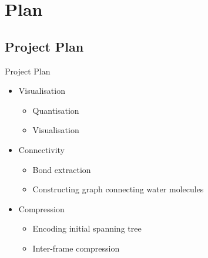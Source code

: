 \documentclass{beamer}
\begin{document}
\section{Plan}


\subsection{Project Plan}
\begin{frame}{Project Plan}
  \begin{itemize}
  \item Visualisation
    \begin{itemize}
    \item Quantisation
    \item Visualisation
    \end{itemize}
  \item Connectivity
    \begin{itemize}
    \item Bond extraction
    \item Constructing graph connecting water molecules
    \end{itemize}
  \item Compression
    \begin{itemize}
    \item Encoding initial spanning tree
    \item Inter-frame compression
    \end{itemize}
  \end{itemize}
\end{frame}
\end{document}
